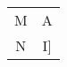 \documentclass{article}
\begin{document}
	\begin{table}
		\centering
		\begin{tabular}{|c|c|}
			\cellcolor{green}M&\cellcolor{blue}A&\\
			\cellcolor{yellow} N &\cellcolor{red}I]\\
		\end{tabular}
	\end{table}
\end{document}
